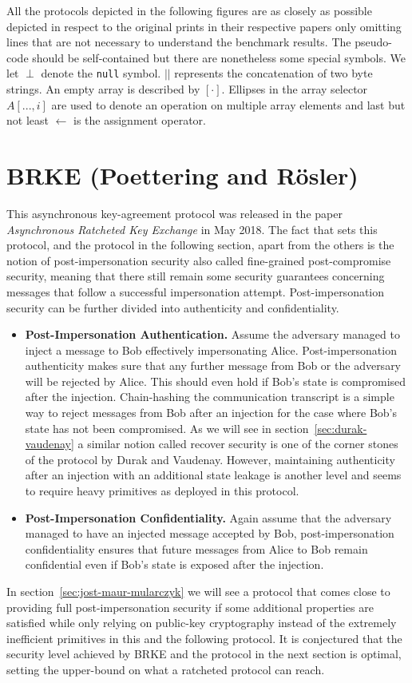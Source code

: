 \documentclass[11pt,a4paper,twoside,openright,bibliography=totoc]{scrbook}
\begin{document}
All the protocols depicted in the following figures are as closely
as possible depicted in respect to the original prints in their respective
papers only omitting lines that are not necessary
to understand the benchmark results. The pseudo-code should be self-contained
but there are nonetheless
some special symbols. We let $\perp$ denote the \texttt{null} symbol.
$||$ represents the concatenation of two byte strings. An empty
array is described by $[\cdot]$. Ellipses in the array selector
$A[...,i]$ are used to
denote an operation on multiple array elements and last but not least
$\leftarrow$ is the assignment operator.

\section[BARK (Poettering and Rösler)]
{BRKE (Poettering and Rösler)~\cite{poettering2018towards}}
\label{sec:poettering-roesler}

This asynchronous key-agreement protocol was released in the paper
\textit{Asynchronous Ratcheted Key Exchange} in May 2018.
The fact that sets this protocol, and the protocol in the following
section, apart from the others is the notion of post-impersonation security
also called fine-grained post-compromise security,
meaning that there still remain some security guarantees concerning
messages that follow a successful
impersonation attempt. Post-impersonation security can be further divided
into authenticity and confidentiality.
\begin{itemize}
\item \textbf{Post-Impersonation Authentication.} Assume the adversary
  managed to inject a message to Bob effectively impersonating Alice.
  Post-impersonation authenticity makes sure that any further message
  from Bob or the adversary will be rejected by Alice. This should even hold if
  Bob's state is compromised after the injection. Chain-hashing
  the communication transcript is a simple way to reject messages from
  Bob after an injection for the case where Bob's state has not
  been compromised. As we will see in section~\ref{sec:durak-vaudenay}
  a similar notion called recover security is one of the corner stones
  of the protocol by Durak and Vaudenay. However, maintaining authenticity
  after an injection with an additional state leakage is another level
  and seems to require heavy primitives as deployed in this protocol.
\item \textbf{Post-Impersonation Confidentiality.} Again assume
  that the adversary managed to have an injected message accepted by Bob,
  post-impersonation confidentiality ensures that future messages from
  Alice to Bob remain
  confidential even if Bob's state is exposed after the injection.
\end{itemize}
In section~\ref{sec:jost-maur-mularczyk} we will see a protocol
that comes close to providing full post-impersonation security
if some additional properties are satisfied while only relying on
public-key cryptography instead of the extremely inefficient
primitives in this and the following protocol. It is conjectured
that the security level achieved by BRKE and the protocol
in the next section is optimal, setting the upper-bound
on what a ratcheted protocol can reach.
\end{document}
